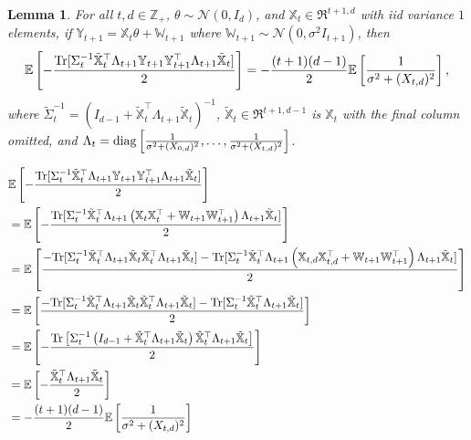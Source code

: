 \documentclass[twoside,11pt]{article}
\renewenvironment{proof}{\par\noindent{\bf Proof\ }}{\hfill\BlackBox\\[2mm]}
\newenvironment{proof}{\par\noindent{\bf Proof\ }}{\hfill\BlackBox\\[2mm]}
\newtheorem{lemma}[theorem]{Lemma}
\def\normal{\mathcal{N}}
\def\E{\mathbb{E}}
\begin{document}
\begin{lemma}
    \label{le:trace_diag_eq}
    For all $t, d\in \mathbb{Z}_{+}$, $\theta\sim\normal(0, I_d)$, and $\mathbb{X}_{t}\in\Re^{t+1, d}$ with iid variance $1$ elements, if $\mathbb{Y}_{t+1} = \mathbb{X}_t \theta + \mathbb{W}_{t+1}$ where $\mathbb{W}_{t+1}\sim\normal(0, \sigma^2I_{t+1})$, then
    $$\E\left[- \frac{{\rm Tr}[\Sigma_{t}^{-1}\tilde{\mathbb{X}}_{t}^\top\Lambda_{t+1}\mathbb{Y}_{t+1}\mathbb{Y}_{t+1}^\top\Lambda_{t+1}\tilde{\mathbb{X}}_{t}]}{2}\right] = -\frac{(t+1)(d-1)}{2}\E\left[\frac{1}{\sigma^2 + (X_{t,d})^2}\right],$$
    where $\tilde{\Sigma}^{-1}_t = \left(I_{d-1} + \tilde{\mathbb{X}}_t^\top\Lambda_{t+1}\tilde{\mathbb{X}}_t\right)^{-1}$, $\tilde{\mathbb{X}}_t \in\Re^{t+1, d-1}$ is $\mathbb{X}_t$ with the final column omitted, and $\Lambda_t = {\rm diag}\left[\frac{1}{\sigma^2 + (X_{0,d})^2},\hdots, \frac{1}{\sigma^2 + (X_{t,d})^2} \right]$.
\end{lemma}
\begin{proof}
    \begin{align*}
        & \E\left[- \frac{{\rm Tr}[\Sigma_{t}^{-1}\tilde{\mathbb{X}}_{t}^\top\Lambda_{t+1}\mathbb{Y}_{t+1}\mathbb{Y}_{t+1}^\top\Lambda_{t+1}\tilde{\mathbb{X}}_{t}]}{2}\right]\\
        & = \E\left[- \frac{{\rm Tr}[\Sigma_{t}^{-1}\tilde{\mathbb{X}}_{t}^\top\Lambda_{t+1}\left( \mathbb{X}_{t}\mathbb{X}_{t}^\top + \mathbb{W}_{t+1}\mathbb{W}_{t+1}^\top \right)\Lambda_{t+1}\tilde{\mathbb{X}}_{t}]}{2}\right]\\
        & = \E\left[\frac{-{\rm Tr}[\Sigma^{-1}_{t}\tilde{\mathbb{X}}_{t}^\top \Lambda_{t+1}\tilde{\mathbb{X}}_{t}\tilde{\mathbb{X}}_{t}^\top\Lambda_{t+1}\tilde{\mathbb{X}}_{t}] - {\rm Tr}[\Sigma^{-1}_{t}\tilde{\mathbb{X}}_{t}^\top\Lambda_{t+1} \left(\mathbb{X}_{t,d}\mathbb{X}_{t,d}^\top + \mathbb{W}_{t+1}\mathbb{W}_{t+1}^\top\right) \Lambda_{t+1}\tilde{\mathbb{X}}_{t}]}{2}\right]\\
        & = \E\left[\frac{-{\rm Tr}[\Sigma^{-1}_{t}\tilde{\mathbb{X}}_{t}^\top \Lambda_{t+1}\tilde{\mathbb{X}}_{t}\tilde{\mathbb{X}}_{t}^\top\Lambda_{t+1}\tilde{\mathbb{X}}_{t}]-{\rm Tr}[\Sigma^{-1}_{t}\tilde{\mathbb{X}}_{t}^\top \Lambda_{t+1}\tilde{\mathbb{X}}_{t}]}{2}\right]\\
        & = \E\left[-\frac{{\rm Tr}\left[\Sigma_{t}^{-1}\left(I_{d-1} + \tilde{\mathbb{X}}^\top_{t}\Lambda_{t+1}\tilde{\mathbb{X}}_{t}\right)\tilde{\mathbb{X}}_{t}^\top\Lambda_{t+1}\tilde{\mathbb{X}}_{t}\right]}{2}\right]\\
        & = \E\left[-\frac{\tilde{\mathbb{X}}_{t}^\top\Lambda_{t+1}\tilde{\mathbb{X}}_{t}}{2}\right]\\
        & = -\frac{(t+1)(d-1)}{2}\E\left[\frac{1}{\sigma^2 + (X_{t,d})^2}\right]
    \end{align*}
\end{proof}
\end{document}
